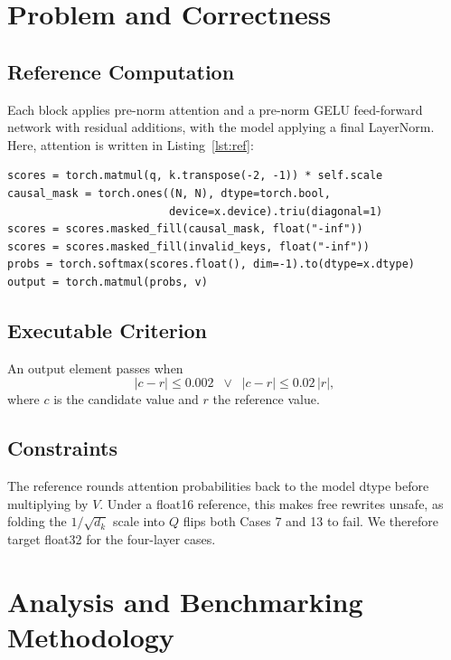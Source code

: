 \documentclass[10pt,conference,compsoc]{IEEEtran}
\begin{document}
\section{Problem and Correctness}

\subsection{Reference Computation}
Each block applies pre-norm attention and a pre-norm GELU feed-forward network with residual additions, with the model applying a final LayerNorm. Here, attention is written in Listing~\ref{lst:ref}:
\vspace{0.5cm}

\begin{lstlisting}[style=code,caption={The reference attention core, abridged from \texttt{BaselineSelfAttention.forward}.},label={lst:ref}]
scores = torch.matmul(q, k.transpose(-2, -1)) * self.scale
causal_mask = torch.ones((N, N), dtype=torch.bool,
                         device=x.device).triu(diagonal=1)
scores = scores.masked_fill(causal_mask, float("-inf"))
scores = scores.masked_fill(invalid_keys, float("-inf"))
probs = torch.softmax(scores.float(), dim=-1).to(dtype=x.dtype)
output = torch.matmul(probs, v)
\end{lstlisting}

\subsection{Executable Criterion}
An output element passes when
\begin{equation}
\lvert c - r \rvert \le 0.002 \;\;\lor\;\; \lvert c - r \rvert \le 0.02\,\lvert r \rvert ,
\label{eq:tol}
\end{equation}
where $c$ is the candidate value and $r$ the reference value.

\subsection{Constraints}
The reference rounds attention probabilities back to the model dtype before multiplying by $V$. Under a float16 reference, this makes free rewrites unsafe, as folding the $1/\sqrt{d_k}$ scale into $Q$ flips both Cases 7 and 13 to fail. We therefore target float32 for the four-layer cases.

\section{Analysis and Benchmarking Methodology}
\label{sec:method}
\end{document}
